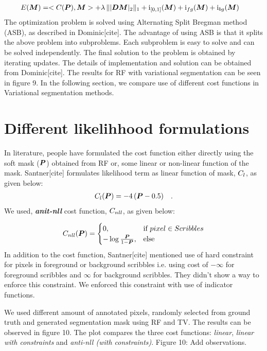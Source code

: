 \begin{align*}
\mathop{{}E}(\boldsymbol{M}) &= <\mathop{{}C}(\boldsymbol{P}), \boldsymbol{M}> + \lambda\, \||\boldsymbol{D}\boldsymbol{M}|_2\|_1 + \mathrm{i}_{[0,1]}(\boldsymbol{M}) + \mathrm{i}_{fg}(\boldsymbol{M})  + \mathrm{i}_{bg}(\boldsymbol{M}) 
\end{align*}
The optimization problem is solved using Alternating Split Bregman method (ASB), as described in Dominic[cite]. The advantage of using ASB is that it splits the above problem into subproblems. Each subproblem is easy to solve and can be solved independently. The final solution to the problem is obtained by iterating updates. The details of implementation and solution can be obtained from Dominic[cite]. The results for RF with variational segmentation can be seen in figure 9. In the following section, we compare use of different cost functions in Variational segmentation methods.

\section{Different likelihhood formulations}
In literature, people have formulated the cost function either directly using the soft mask ($\boldsymbol{P}$) obtained from RF or, some linear or non-linear function of the mask. Santner[cite] formulates likelihood term as linear function of mask, $\mathop{{}C_l}$, as given below:
\begin{align*}
\mathop{{}C_l}(\boldsymbol{P}) = -4\,(\boldsymbol{P}-0.5) \quad .
\end{align*}
We used, \textbf{\textit{anit-nll}} cost function, $\mathop{{}C_{nll}}$, as given below:

\begin{align*}
\mathop{{}C_{nll}}(\boldsymbol{P}) =
\begin{cases}
  0, & \text{if}\ pixel \in Scribbles  \\
  -\log \frac{\boldsymbol{P}}{1-\boldsymbol{P}}, & \text{else}
\end{cases}
\end{align*} 
In addition to the cost function, Santner[cite] mentioned use of hard constraint for pixels in foreground or background scribbles i.e. using cost of $-\infty$ for foreground scribbles and $\infty$ for background scribbles. They didn't show a way to enforce this constraint. We enforced this constraint with use of indicator functions. \par
We used different amount of annotated pixels, randomly selected from ground truth and generated segmentation mask using RF and TV. The results can be observed in figure 10. The plot compares the three cost functions: \textit{linear}, \textit{linear with constraints} and \textit{anti-nll (with constraints)}.  Figure 10: Add observations.

